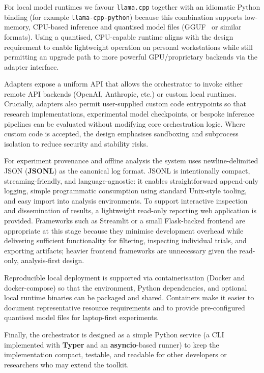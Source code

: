 For local model runtimes we favour \texttt{llama.cpp} together with an idiomatic Python binding (for example \texttt{llama-cpp-python}) because this combination supports low-memory, CPU-based inference and quantised model files (GGUF~\cite{gerganov2023gguf} or similar formats).
Using a quantised, CPU-capable runtime aligns with the design requirement to enable lightweight operation on personal workstations while still permitting an upgrade path to more powerful GPU/proprietary backends via the adapter interface.

Adapters expose a uniform API that allows the orchestrator to invoke either remote API backends (OpenAI, Anthropic, etc.) or custom local runtimes.
Crucially, adapters also permit user-supplied custom code entrypoints so that research implementations, experimental model checkpoints, or bespoke inference pipelines can be evaluated without modifying core orchestration logic.
Where custom code is accepted, the design emphasises sandboxing and subprocess isolation to reduce security and stability risks.

For experiment provenance and offline analysis the system uses newline-delimited JSON (\textbf{JSONL}) as the canonical log format.
JSONL is intentionally compact, streaming-friendly, and language-agnostic: it enables straightforward append-only logging, simple programmatic consumption using standard Unix-style tooling, and easy import into analysis environments.
To support interactive inspection and dissemination of results, a lightweight read-only reporting web application is provided.
Frameworks such as Streamlit or a small Flask-backed frontend are appropriate at this stage because they minimise development overhead while delivering sufficient functionality for filtering, inspecting individual trials, and exporting artifacts; heavier frontend frameworks are unnecessary given the read-only, analysis-first design.

Reproducible local deployment is supported via containerisation (Docker and docker-compose) so that the environment, Python dependencies, and optional local runtime binaries can be packaged and shared.
Containers make it easier to document representative resource requirements and to provide pre-configured quantised model files for laptop-first experiments.

Finally, the orchestrator is designed as a simple Python service (a CLI implemented with \textbf{Typer} and an \textbf{asyncio}-based runner) to keep the implementation compact, testable, and readable for other developers or researchers who may extend the toolkit.

